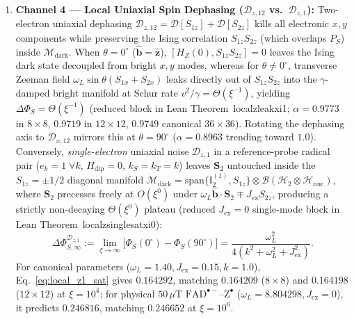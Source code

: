 \documentclass[twocolumn,10pt,amsmath,amssymb,floatfix]{revtex4-2}
\theoremstyle{plain}
\theoremstyle{definition}
\newcommand{\PS}{P_S}
\newcommand{\HZ}{H_Z}
\newcommand{\Hdip}{H_{\mathrm{dip}}}
\newcommand{\DeltaPhi}{\Delta\Phi_S}
\newcommand{\leanid}[1]{{\footnotesize\ttfamily\def\_{\textunderscore\allowbreak}#1}}
\begin{document}
\begin{enumerate}[leftmargin=1.4em,itemsep=2pt]
\item \textbf{Channel 4 --- Local Uniaxial Spin Dephasing ($\mathcal{D}_{z,12}$ vs.\ $\mathcal{D}_{z,1}$):} Two-electron uniaxial dephasing $\mathcal{D}_{z,12} = \mathcal{D}[S_{1z}] + \mathcal{D}[S_{2z}]$ kills all electronic $x,y$ components while preserving the Ising correlation $S_{1z} S_{2z}$ (which overlaps $\PS$) inside $\mathcal{M}_{\mathrm{dark}}$. When $\theta = 0^\circ$ ($\hat{\mathbf{b}} = \hat{\mathbf{z}}$), $[\HZ(0), S_{1z} S_{2z}] = 0$ leaves the Ising dark state decoupled from bright $x,y$ modes, whereas for $\theta \neq 0^\circ$, transverse Zeeman field $\omega_L \sin\theta (S_{1x} + S_{2x})$ leaks directly out of $S_{1z}S_{2z}$ into the $\gamma$-damped bright manifold at Schur rate $v^2/\gamma = \Theta(\xi^{-1})$, yielding $\DeltaPhi = \Theta(\xi^{-1})$ (reduced block in Lean Theorem~\leanid{local\_z\_leak\_xi1}; $\alpha = 0.9773$ in $8\times 8$, $0.9719$ in $12\times 12$, $0.9749$ canonical $36\times 36$). Rotating the dephasing axis to $\mathcal{D}_{x,12}$ mirrors this at $\theta=90^\circ$ ($\alpha = 0.8963$ trending toward $1.0$). Conversely, \emph{single-electron} uniaxial noise $\mathcal{D}_{z,1}$ in a reference-probe radical pair ($e_k = 1\;\forall k$, $\Hdip = 0$, $k_S = k_T = k$) leaves $\mathbf{S}_2$ untouched inside the $S_{1z}=\pm 1/2$ diagonal manifold $\mathcal{M}_{\mathrm{dark}} = \mathrm{span}\{\mathbb{I}_2^{(1)}, S_{1z}\}\otimes\mathcal{B}(\mathcal{H}_2\otimes\mathcal{H}_{\mathrm{nuc}})$, where $\mathbf{S}_2$ precesses freely at $O(\xi^0)$ under $\omega_L\hat{\mathbf{b}}\cdot\mathbf{S}_2 \mp J_{\mathrm{ex}} S_{2z}$, producing a strictly non-decaying $\Theta(\xi^0)$ plateau (reduced $J_{\mathrm{ex}}=0$ single-mode block in Lean Theorem~\leanid{local\_z\_single\_sat\_xi0}):
\begin{equation}
\label{eq:local_z1_sat}
\Delta\Phi_{S,\infty}^{\mathcal{D}_{z,1}} := \lim_{\xi\to\infty}\bigl[\Phi_S(0^\circ) - \Phi_S(90^\circ)\bigr] = \frac{\omega_L^2}{4(k^2 + \omega_L^2 + J_{\mathrm{ex}}^2)}.
\end{equation}
For canonical parameters ($\omega_L=1.40, J_{\mathrm{ex}}=0.15, k=1.0$), Eq.~\eqref{eq:local_z1_sat} gives $0.164292$, matching $0.164209$ ($8\times 8$) and $0.164198$ ($12\times 12$) at $\xi=10^4$; for physical $50\,\mu\text{T}$ $\mathrm{FAD}^{\bullet-}\text{--}\mathrm{Z}^{\bullet}$ ($\omega_L=8.804298, J_{\mathrm{ex}}=0$), it predicts $0.246816$, matching $0.246652$ at $\xi=10^6$.

\end{enumerate}
\end{document}
